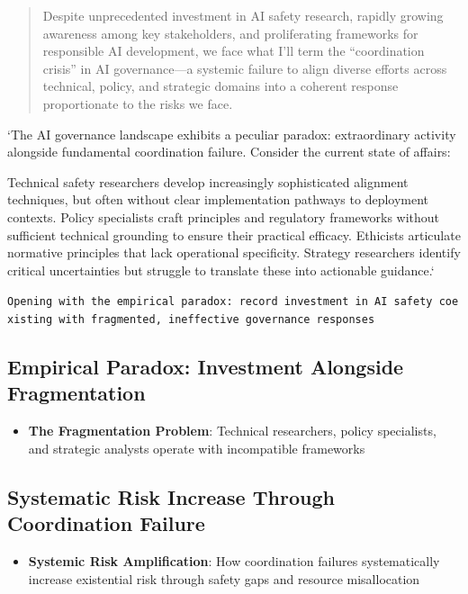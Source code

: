 \documentclass[
  11pt,
  letterpaper,
]{book}
\providecommand{\tightlist}{%
  \setlength{\itemsep}{0pt}\setlength{\parskip}{0pt}}
\begin{document}
\begin{quote}
Despite unprecedented investment in AI safety research, rapidly growing
awareness among key stakeholders, and proliferating frameworks for
responsible AI development, we face what I'll term the ``coordination
crisis'' in AI governance---a systemic failure to align diverse efforts
across technical, policy, and strategic domains into a coherent response
proportionate to the risks we face.
\end{quote}

`The AI governance landscape exhibits a peculiar paradox: extraordinary
activity alongside fundamental coordination failure. Consider the
current state of affairs:

Technical safety researchers develop increasingly sophisticated
alignment techniques, but often without clear implementation pathways to
deployment contexts. Policy specialists craft principles and regulatory
frameworks without sufficient technical grounding to ensure their
practical efficacy. Ethicists articulate normative principles that lack
operational specificity. Strategy researchers identify critical
uncertainties but struggle to translate these into actionable guidance.`

\texttt{Opening\ with\ the\ empirical\ paradox:\ record\ investment\ in\ AI\ safety\ coexisting\ with\ fragmented,\ ineffective\ governance\ responses}

\subsection{Empirical Paradox: Investment Alongside
Fragmentation}\label{sec-empirical-paradox}

\begin{itemize}
\tightlist
\item
  \textbf{The Fragmentation Problem}: Technical researchers, policy
  specialists, and strategic analysts operate with incompatible
  frameworks
\end{itemize}

\subsection{Systematic Risk Increase Through Coordination
Failure}\label{sec-risk-increase}

\begin{itemize}
\tightlist
\item
  \textbf{Systemic Risk Amplification}: How coordination failures
  systematically increase existential risk through safety gaps and
  resource misallocation
\end{itemize}
\end{document}
